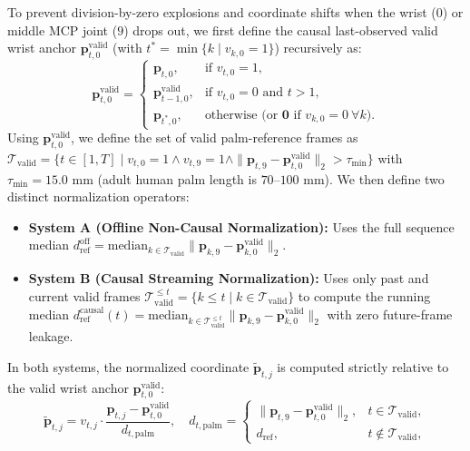 \documentclass[10pt,twocolumn]{article}
\begin{document}
To prevent division-by-zero explosions and coordinate shifts when the wrist ($0$) or middle MCP joint ($9$) drops out, we first define the causal last-observed valid wrist anchor $\mathbf{p}_{t,0}^{\text{valid}}$ (with $t^* = \min\{k \mid v_{k,0}=1\}$) recursively as:
\begin{equation}
\mathbf{p}_{t,0}^{\text{valid}} = 
\begin{cases} 
\mathbf{p}_{t,0}, & \text{if } v_{t,0} = 1, \\
\mathbf{p}_{t-1,0}^{\text{valid}}, & \text{if } v_{t,0} = 0 \text{ and } t > 1, \\
\mathbf{p}_{t^*,0}, & \text{otherwise (or } \mathbf{0} \text{ if } v_{k,0}=0\ \forall k\text{)}.
\end{cases}
\end{equation}
Using $\mathbf{p}_{t,0}^{\text{valid}}$, we define the set of valid palm-reference frames as $\mathcal{T}_{\text{valid}} = \{t \in [1,T] \mid v_{t,0}=1 \wedge v_{t,9}=1 \wedge \|\mathbf{p}_{t,9} - \mathbf{p}_{t,0}^{\text{valid}}\|_2 > \tau_{\min}\}$ with $\tau_{\min} = 15.0\text{ mm}$ (adult human palm length is $70\text{--}100\text{ mm}$). We then define two distinct normalization operators:
\begin{itemize}
    \item \textbf{System A (Offline Non-Causal Normalization):} Uses the full sequence median $d_{\text{ref}}^{\text{off}} = \text{median}_{k \in \mathcal{T}_{\text{valid}}} \|\mathbf{p}_{k,9} - \mathbf{p}_{k,0}^{\text{valid}}\|_2$.
    \item \textbf{System B (Causal Streaming Normalization):} Uses only past and current valid frames $\mathcal{T}_{\text{valid}}^{\le t} = \{k \le t \mid k \in \mathcal{T}_{\text{valid}}\}$ to compute the running median $d_{\text{ref}}^{\text{causal}}(t) = \text{median}_{k \in \mathcal{T}_{\text{valid}}^{\le t}} \|\mathbf{p}_{k,9} - \mathbf{p}_{k,0}^{\text{valid}}\|_2$ with zero future-frame leakage.
\end{itemize}
In both systems, the normalized coordinate $\tilde{\mathbf{p}}_{t,j}$ is computed strictly relative to the valid wrist anchor $\mathbf{p}_{t,0}^{\text{valid}}$:
\begin{equation}
\tilde{\mathbf{p}}_{t,j} = v_{t,j} \cdot \frac{\mathbf{p}_{t,j} - \mathbf{p}_{t,0}^{\text{valid}}}{d_{t,\text{palm}}}, \quad d_{t,\text{palm}} = 
\begin{cases} 
\|\mathbf{p}_{t,9} - \mathbf{p}_{t,0}^{\text{valid}}\|_2, & t \in \mathcal{T}_{\text{valid}}, \\
d_{\text{ref}}, & t \notin \mathcal{T}_{\text{valid}},
\end{cases}
\end{equation}
\end{document}

